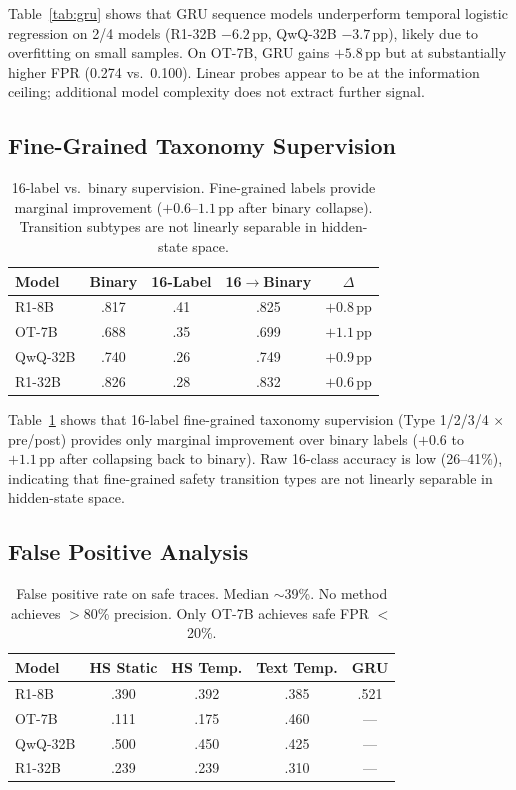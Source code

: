 \documentclass[11pt]{article}
\newcommand{\pp}{\,\text{pp}}
\begin{document}
Table~\ref{tab:gru} shows that GRU sequence models underperform temporal logistic regression on 2/4 models (R1-32B $-6.2\pp$, QwQ-32B $-3.7\pp$), likely due to overfitting on small samples.
On OT-7B, GRU gains $+5.8\pp$ but at substantially higher FPR (0.274 vs.\ 0.100).
Linear probes appear to be at the information ceiling; additional model complexity does not extract further signal.

\subsection{Fine-Grained Taxonomy Supervision}
\label{sec:taxonomy}

\begin{table}[t]
\centering
\small
\begin{tabular}{@{}lcccc@{}}
\toprule
\textbf{Model} & \textbf{Binary} & \textbf{16-Label} & \textbf{16$\rightarrow$Binary} & \textbf{$\Delta$} \\
\midrule
R1-8B & .817 & .41 & .825 & $+0.8\pp$ \\
OT-7B & .688 & .35 & .699 & $+1.1\pp$ \\
QwQ-32B & .740 & .26 & .749 & $+0.9\pp$ \\
R1-32B & .826 & .28 & .832 & $+0.6\pp$ \\
\bottomrule
\end{tabular}
\caption{16-label vs.\ binary supervision. Fine-grained labels provide marginal improvement ($+0.6$--$1.1\pp$ after binary collapse). Transition subtypes are not linearly separable in hidden-state space.}
\label{tab:taxonomy}
\end{table}

Table~\ref{tab:taxonomy} shows that 16-label fine-grained taxonomy supervision (Type 1/2/3/4 $\times$ pre/post) provides only marginal improvement over binary labels ($+0.6$ to $+1.1\pp$ after collapsing back to binary).
Raw 16-class accuracy is low (26--41\%), indicating that fine-grained safety transition types are not linearly separable in hidden-state space.

\subsection{False Positive Analysis}
\label{sec:fpr}

\begin{table}[t]
\centering
\small
\begin{tabular}{@{}lcccc@{}}
\toprule
\textbf{Model} & \textbf{HS Static} & \textbf{HS Temp.} & \textbf{Text Temp.} & \textbf{GRU} \\
\midrule
R1-8B & .390 & .392 & .385 & .521 \\
OT-7B & .111 & .175 & .460 & --- \\
QwQ-32B & .500 & .450 & .425 & --- \\
R1-32B & .239 & .239 & .310 & --- \\
\bottomrule
\end{tabular}
\caption{False positive rate on safe traces. Median $\sim$39\%. No method achieves $>$80\% precision. Only OT-7B achieves safe FPR $<$ 20\%.}
\label{tab:safe_fpr}
\end{table}
\end{document}
